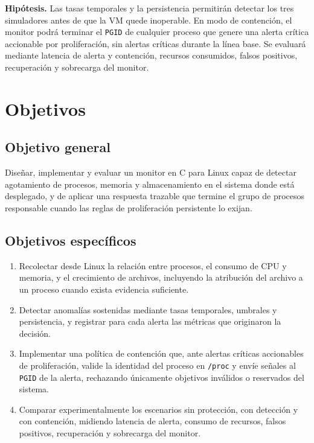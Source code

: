 \textbf{Hipótesis.} Las tasas temporales y la persistencia permitirán detectar
los tres simuladores antes de que la VM quede inoperable. En modo de contención,
el monitor podrá terminar el \texttt{PGID} de cualquier proceso que genere una
alerta crítica accionable por proliferación, sin alertas críticas durante la
línea base. Se evaluará mediante latencia de alerta y contención, recursos
consumidos, falsos positivos, recuperación y sobrecarga del monitor.

\clearpage

\section{Objetivos}

\subsection{Objetivo general}

Diseñar, implementar y evaluar un monitor en C para Linux capaz de detectar
agotamiento de procesos, memoria y almacenamiento en el sistema donde está
desplegado, y de aplicar una respuesta trazable que termine el grupo de
procesos responsable cuando las reglas de proliferación persistente lo exijan.

\subsection{Objetivos específicos}

\begin{enumerate}
  \item Recolectar desde Linux la relación entre procesos, el consumo de CPU y
  memoria, y el crecimiento de archivos, incluyendo la atribución del archivo a
  un proceso cuando exista evidencia suficiente.

  \item Detectar anomalías sostenidas mediante tasas temporales, umbrales y
  persistencia, y registrar para cada alerta las métricas que originaron la
  decisión.

  \item Implementar una política de contención que, ante alertas críticas
  accionables de proliferación, valide la identidad del proceso en
  \texttt{/proc} y envíe señales al \texttt{PGID} de la alerta, rechazando
  únicamente objetivos inválidos o reservados del sistema.

  \item Comparar experimentalmente los escenarios sin protección, con detección
  y con contención, midiendo latencia de alerta, consumo de recursos, falsos
  positivos, recuperación y sobrecarga del monitor.
\end{enumerate}
